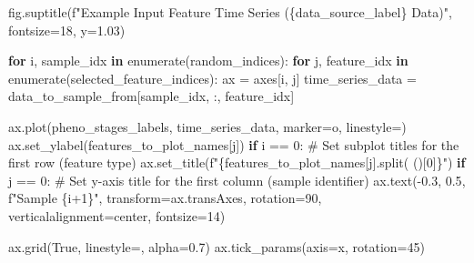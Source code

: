 \documentclass[
  letterpaper,
  DIV=11,
  numbers=noendperiod]{scrreprt}
\newenvironment{Shaded}{\begin{snugshade}}{\end{snugshade}}
\newcommand{\BuiltInTok}[1]{\textcolor[rgb]{0.00,0.23,0.31}{#1}}
\newcommand{\CommentTok}[1]{\textcolor[rgb]{0.37,0.37,0.37}{#1}}
\newcommand{\ControlFlowTok}[1]{\textcolor[rgb]{0.00,0.23,0.31}{\textbf{#1}}}
\newcommand{\DecValTok}[1]{\textcolor[rgb]{0.68,0.00,0.00}{#1}}
\newcommand{\FloatTok}[1]{\textcolor[rgb]{0.68,0.00,0.00}{#1}}
\newcommand{\KeywordTok}[1]{\textcolor[rgb]{0.00,0.23,0.31}{\textbf{#1}}}
\newcommand{\NormalTok}[1]{\textcolor[rgb]{0.00,0.23,0.31}{#1}}
\newcommand{\OperatorTok}[1]{\textcolor[rgb]{0.37,0.37,0.37}{#1}}
\newcommand{\SpecialCharTok}[1]{\textcolor[rgb]{0.37,0.37,0.37}{#1}}
\newcommand{\SpecialStringTok}[1]{\textcolor[rgb]{0.13,0.47,0.30}{#1}}
\newcommand{\StringTok}[1]{\textcolor[rgb]{0.13,0.47,0.30}{#1}}
\newcommand{\VariableTok}[1]{\textcolor[rgb]{0.07,0.07,0.07}{#1}}
\begin{document}
\begin{Shaded}
\begin{Highlighting}[]
\NormalTok{    fig.suptitle(}\SpecialStringTok{f"Example Input Feature Time Series (}\SpecialCharTok{\{}\NormalTok{data\_source\_label}\SpecialCharTok{\}}\SpecialStringTok{ Data)"}\NormalTok{, fontsize}\OperatorTok{=}\DecValTok{18}\NormalTok{, y}\OperatorTok{=}\FloatTok{1.03}\NormalTok{)}

    \ControlFlowTok{for}\NormalTok{ i, sample\_idx }\KeywordTok{in} \BuiltInTok{enumerate}\NormalTok{(random\_indices):}
        \ControlFlowTok{for}\NormalTok{ j, feature\_idx }\KeywordTok{in} \BuiltInTok{enumerate}\NormalTok{(selected\_feature\_indices):}
\NormalTok{            ax }\OperatorTok{=}\NormalTok{ axes[i, j]}
\NormalTok{            time\_series\_data }\OperatorTok{=}\NormalTok{ data\_to\_sample\_from[sample\_idx, :, feature\_idx]}

\NormalTok{            ax.plot(pheno\_stages\_labels, time\_series\_data, marker}\OperatorTok{=}\StringTok{\textquotesingle{}o\textquotesingle{}}\NormalTok{, linestyle}\OperatorTok{=}\StringTok{\textquotesingle{}{-}\textquotesingle{}}\NormalTok{)}
\NormalTok{            ax.set\_ylabel(features\_to\_plot\_names[j])}
            \ControlFlowTok{if}\NormalTok{ i }\OperatorTok{==} \DecValTok{0}\NormalTok{: }\CommentTok{\# Set subplot titles for the first row (feature type)}
\NormalTok{                 ax.set\_title(}\SpecialStringTok{f"}\SpecialCharTok{\{}\NormalTok{features\_to\_plot\_names[j]}\SpecialCharTok{.}\NormalTok{split(}\StringTok{\textquotesingle{} (\textquotesingle{}}\NormalTok{)[}\DecValTok{0}\NormalTok{]}\SpecialCharTok{\}}\SpecialStringTok{"}\NormalTok{)}
            \ControlFlowTok{if}\NormalTok{ j }\OperatorTok{==} \DecValTok{0}\NormalTok{: }\CommentTok{\# Set y{-}axis title for the first column (sample identifier)}
\NormalTok{                 ax.text(}\OperatorTok{{-}}\FloatTok{0.3}\NormalTok{, }\FloatTok{0.5}\NormalTok{, }\SpecialStringTok{f"Sample }\SpecialCharTok{\{}\NormalTok{i}\OperatorTok{+}\DecValTok{1}\SpecialCharTok{\}}\SpecialStringTok{"}\NormalTok{, transform}\OperatorTok{=}\NormalTok{ax.transAxes,}
\NormalTok{                         rotation}\OperatorTok{=}\DecValTok{90}\NormalTok{, verticalalignment}\OperatorTok{=}\StringTok{\textquotesingle{}center\textquotesingle{}}\NormalTok{, fontsize}\OperatorTok{=}\DecValTok{14}\NormalTok{)}

\NormalTok{            ax.grid(}\VariableTok{True}\NormalTok{, linestyle}\OperatorTok{=}\StringTok{\textquotesingle{}{-}{-}\textquotesingle{}}\NormalTok{, alpha}\OperatorTok{=}\FloatTok{0.7}\NormalTok{)}
\NormalTok{            ax.tick\_params(axis}\OperatorTok{=}\StringTok{\textquotesingle{}x\textquotesingle{}}\NormalTok{, rotation}\OperatorTok{=}\DecValTok{45}\NormalTok{)}


\end{Highlighting}
\end{Shaded}
\end{document}
